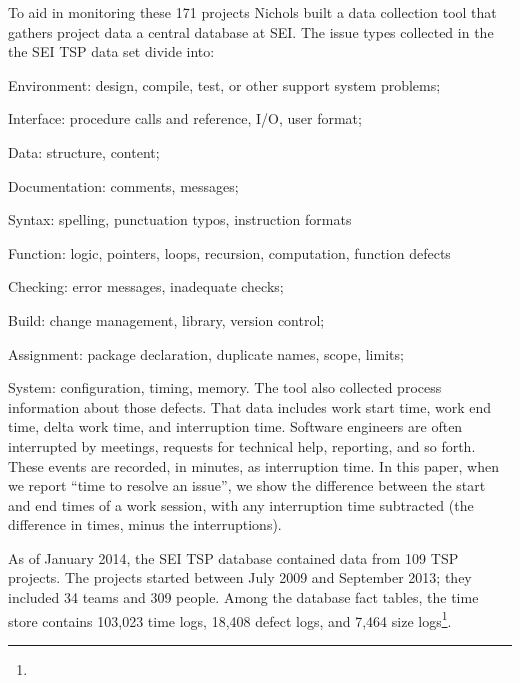 To aid in monitoring these 171 projects  Nichols  built a
data collection tool that gathers project data a central database at SEI. 
The issue types collected in the the SEI TSP data set divide into:
\be 
\item Environment: design, compile, test, or other support system problems;
\item Interface: procedure calls and reference, I/O, user format;
\item Data: structure, content; 
\item Documentation: comments, messages;
\item Syntax: spelling, punctuation typos, instruction formats
\item Function: logic, pointers, loops, recursion, computation, function defects  
\item Checking: error messages, inadequate checks;
\item Build: change management, library, version control;
\item Assignment: package
declaration, duplicate names, scope, limits;
\item System: configuration, timing, memory.
\ee
The tool also collected process information about those defects.
That data includes  work start time, work end time, delta
work time, and interruption time. Software engineers are often
interrupted by meetings, requests for technical help, reporting, and
so forth. These events are recorded, in minutes, as interruption
time. In this paper, when we report ``time to resolve an
issue'', we show the difference between the start and end times
of a work session, with any interruption time subtracted (the
difference in times, minus the interruptions).  




As of January 2014, the SEI TSP database contained data from 109
TSP projects. The projects started between July 2009 and
September 2013; they included 34 teams and 309 people. Among
the database fact tables, the time store contains 103,023 time logs,
18,408 defect logs, and 7,464 size logs\footnote{}.  


%
 
